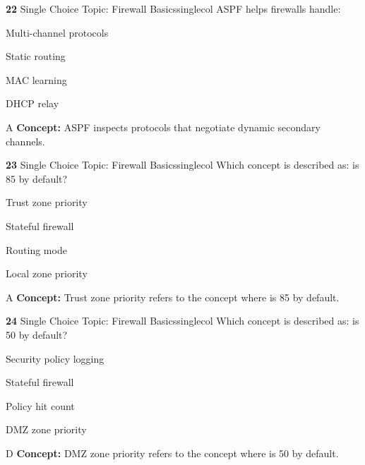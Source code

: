 \documentclass[10pt,a4paper]{article}
\begin{document}
\begin{qcard}{\color{white}\textbf{22} \hfill \small Single Choice \textbar{} Topic: Firewall Basics}{singlecol}
ASPF helps firewalls handle:

\begin{qoptions}
\item Multi-channel protocols
\item Static routing
\item MAC learning
\item DHCP relay
\end{qoptions}
\begin{explainbox}{A}
\textbf{Concept:} ASPF inspects protocols that negotiate dynamic secondary channels.
\end{explainbox}
\end{qcard}

\begin{qcard}{\color{white}\textbf{23} \hfill \small Single Choice \textbar{} Topic: Firewall Basics}{singlecol}
Which concept is described as: is 85 by default?

\begin{qoptions}
\item Trust zone priority
\item Stateful firewall
\item Routing mode
\item Local zone priority
\end{qoptions}
\begin{explainbox}{A}
\textbf{Concept:} Trust zone priority refers to the concept where is 85 by default.
\end{explainbox}
\end{qcard}

\begin{qcard}{\color{white}\textbf{24} \hfill \small Single Choice \textbar{} Topic: Firewall Basics}{singlecol}
Which concept is described as: is 50 by default?

\begin{qoptions}
\item Security policy logging
\item Stateful firewall
\item Policy hit count
\item DMZ zone priority
\end{qoptions}
\begin{explainbox}{D}
\textbf{Concept:} DMZ zone priority refers to the concept where is 50 by default.
\end{explainbox}
\end{qcard}
\end{document}
